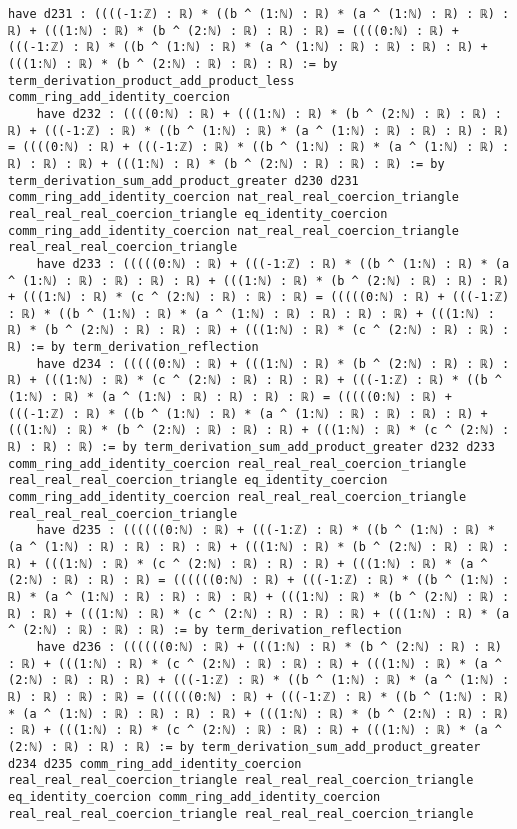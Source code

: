 \documentclass{article}
\begin{document}
\begin{tcolorbox}[colback=white!10, width=\linewidth]
\begin{lstlisting}[language=Lean4]
    have d231 : ((((-1:ℤ) : ℝ) * ((b ^ (1:ℕ) : ℝ) * (a ^ (1:ℕ) : ℝ) : ℝ) : ℝ) + (((1:ℕ) : ℝ) * (b ^ (2:ℕ) : ℝ) : ℝ) : ℝ) = ((((0:ℕ) : ℝ) + (((-1:ℤ) : ℝ) * ((b ^ (1:ℕ) : ℝ) * (a ^ (1:ℕ) : ℝ) : ℝ) : ℝ) : ℝ) + (((1:ℕ) : ℝ) * (b ^ (2:ℕ) : ℝ) : ℝ) : ℝ) := by term_derivation_product_add_product_less comm_ring_add_identity_coercion
    have d232 : ((((0:ℕ) : ℝ) + (((1:ℕ) : ℝ) * (b ^ (2:ℕ) : ℝ) : ℝ) : ℝ) + (((-1:ℤ) : ℝ) * ((b ^ (1:ℕ) : ℝ) * (a ^ (1:ℕ) : ℝ) : ℝ) : ℝ) : ℝ) = ((((0:ℕ) : ℝ) + (((-1:ℤ) : ℝ) * ((b ^ (1:ℕ) : ℝ) * (a ^ (1:ℕ) : ℝ) : ℝ) : ℝ) : ℝ) + (((1:ℕ) : ℝ) * (b ^ (2:ℕ) : ℝ) : ℝ) : ℝ) := by term_derivation_sum_add_product_greater d230 d231 comm_ring_add_identity_coercion nat_real_real_coercion_triangle real_real_real_coercion_triangle eq_identity_coercion comm_ring_add_identity_coercion nat_real_real_coercion_triangle real_real_real_coercion_triangle
    have d233 : (((((0:ℕ) : ℝ) + (((-1:ℤ) : ℝ) * ((b ^ (1:ℕ) : ℝ) * (a ^ (1:ℕ) : ℝ) : ℝ) : ℝ) : ℝ) + (((1:ℕ) : ℝ) * (b ^ (2:ℕ) : ℝ) : ℝ) : ℝ) + (((1:ℕ) : ℝ) * (c ^ (2:ℕ) : ℝ) : ℝ) : ℝ) = (((((0:ℕ) : ℝ) + (((-1:ℤ) : ℝ) * ((b ^ (1:ℕ) : ℝ) * (a ^ (1:ℕ) : ℝ) : ℝ) : ℝ) : ℝ) + (((1:ℕ) : ℝ) * (b ^ (2:ℕ) : ℝ) : ℝ) : ℝ) + (((1:ℕ) : ℝ) * (c ^ (2:ℕ) : ℝ) : ℝ) : ℝ) := by term_derivation_reflection
    have d234 : (((((0:ℕ) : ℝ) + (((1:ℕ) : ℝ) * (b ^ (2:ℕ) : ℝ) : ℝ) : ℝ) + (((1:ℕ) : ℝ) * (c ^ (2:ℕ) : ℝ) : ℝ) : ℝ) + (((-1:ℤ) : ℝ) * ((b ^ (1:ℕ) : ℝ) * (a ^ (1:ℕ) : ℝ) : ℝ) : ℝ) : ℝ) = (((((0:ℕ) : ℝ) + (((-1:ℤ) : ℝ) * ((b ^ (1:ℕ) : ℝ) * (a ^ (1:ℕ) : ℝ) : ℝ) : ℝ) : ℝ) + (((1:ℕ) : ℝ) * (b ^ (2:ℕ) : ℝ) : ℝ) : ℝ) + (((1:ℕ) : ℝ) * (c ^ (2:ℕ) : ℝ) : ℝ) : ℝ) := by term_derivation_sum_add_product_greater d232 d233 comm_ring_add_identity_coercion real_real_real_coercion_triangle real_real_real_coercion_triangle eq_identity_coercion comm_ring_add_identity_coercion real_real_real_coercion_triangle real_real_real_coercion_triangle
    have d235 : ((((((0:ℕ) : ℝ) + (((-1:ℤ) : ℝ) * ((b ^ (1:ℕ) : ℝ) * (a ^ (1:ℕ) : ℝ) : ℝ) : ℝ) : ℝ) + (((1:ℕ) : ℝ) * (b ^ (2:ℕ) : ℝ) : ℝ) : ℝ) + (((1:ℕ) : ℝ) * (c ^ (2:ℕ) : ℝ) : ℝ) : ℝ) + (((1:ℕ) : ℝ) * (a ^ (2:ℕ) : ℝ) : ℝ) : ℝ) = ((((((0:ℕ) : ℝ) + (((-1:ℤ) : ℝ) * ((b ^ (1:ℕ) : ℝ) * (a ^ (1:ℕ) : ℝ) : ℝ) : ℝ) : ℝ) + (((1:ℕ) : ℝ) * (b ^ (2:ℕ) : ℝ) : ℝ) : ℝ) + (((1:ℕ) : ℝ) * (c ^ (2:ℕ) : ℝ) : ℝ) : ℝ) + (((1:ℕ) : ℝ) * (a ^ (2:ℕ) : ℝ) : ℝ) : ℝ) := by term_derivation_reflection
    have d236 : ((((((0:ℕ) : ℝ) + (((1:ℕ) : ℝ) * (b ^ (2:ℕ) : ℝ) : ℝ) : ℝ) + (((1:ℕ) : ℝ) * (c ^ (2:ℕ) : ℝ) : ℝ) : ℝ) + (((1:ℕ) : ℝ) * (a ^ (2:ℕ) : ℝ) : ℝ) : ℝ) + (((-1:ℤ) : ℝ) * ((b ^ (1:ℕ) : ℝ) * (a ^ (1:ℕ) : ℝ) : ℝ) : ℝ) : ℝ) = ((((((0:ℕ) : ℝ) + (((-1:ℤ) : ℝ) * ((b ^ (1:ℕ) : ℝ) * (a ^ (1:ℕ) : ℝ) : ℝ) : ℝ) : ℝ) + (((1:ℕ) : ℝ) * (b ^ (2:ℕ) : ℝ) : ℝ) : ℝ) + (((1:ℕ) : ℝ) * (c ^ (2:ℕ) : ℝ) : ℝ) : ℝ) + (((1:ℕ) : ℝ) * (a ^ (2:ℕ) : ℝ) : ℝ) : ℝ) := by term_derivation_sum_add_product_greater d234 d235 comm_ring_add_identity_coercion real_real_real_coercion_triangle real_real_real_coercion_triangle eq_identity_coercion comm_ring_add_identity_coercion real_real_real_coercion_triangle real_real_real_coercion_triangle

\end{lstlisting}
\end{tcolorbox}
\end{document}
